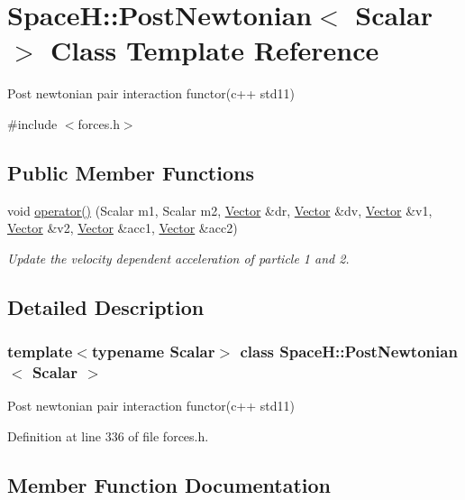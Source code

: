 \hypertarget{class_space_h_1_1_post_newtonian}{}\section{SpaceH\+:\+:Post\+Newtonian$<$ Scalar $>$ Class Template Reference}
\label{class_space_h_1_1_post_newtonian}


Post newtonian pair interaction functor(c++ std11)  




{\ttfamily \#include $<$forces.\+h$>$}

\subsection*{Public Member Functions}
\begin{DoxyCompactItemize}
\item 
void \mbox{\hyperlink{class_space_h_1_1_post_newtonian_a525a7fc48794effd7513bf56b929bf43}{operator()}} (Scalar m1, Scalar m2, \mbox{\hyperlink{structvec3}{Vector}} \&dr, \mbox{\hyperlink{structvec3}{Vector}} \&dv, \mbox{\hyperlink{structvec3}{Vector}} \&v1, \mbox{\hyperlink{structvec3}{Vector}} \&v2, \mbox{\hyperlink{structvec3}{Vector}} \&acc1, \mbox{\hyperlink{structvec3}{Vector}} \&acc2)
\begin{DoxyCompactList}\small\item\em Update the velocity dependent acceleration of particle 1 and 2. \end{DoxyCompactList}\end{DoxyCompactItemize}


\subsection{Detailed Description}
\subsubsection*{template$<$typename Scalar$>$\newline
class Space\+H\+::\+Post\+Newtonian$<$ Scalar $>$}

Post newtonian pair interaction functor(c++ std11) 

Definition at line 336 of file forces.\+h.



\subsection{Member Function Documentation}
\mbox{\label{class_space_h_1_1_post_newtonian_a525a7fc48794effd7513bf56b929bf43}} 
